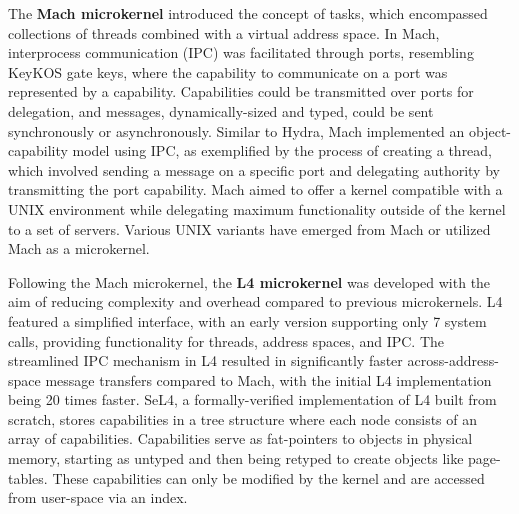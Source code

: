 The \textbf{Mach microkernel} introduced the concept of tasks, which encompassed collections of threads 
combined with a virtual address space. In Mach, interprocess communication (IPC) was facilitated through 
ports, resembling KeyKOS gate keys, where the capability to communicate on a port was represented by a 
capability. Capabilities could be transmitted over ports for delegation, and messages, dynamically-sized 
and typed, could be sent synchronously or asynchronously. Similar to Hydra, Mach implemented an object-capability 
model using IPC, as exemplified by the process of creating a thread, which involved sending a message on a specific 
port and delegating authority by transmitting the port capability. Mach aimed to offer a kernel compatible with a 
UNIX environment while delegating maximum functionality outside of the kernel to a set of servers. Various 
UNIX variants have emerged from Mach or utilized Mach as a microkernel.
\newline

Following the Mach microkernel, the \textbf{L4 microkernel} was developed with the aim of reducing complexity and 
overhead compared to previous microkernels. L4 featured a simplified interface, with an early version 
supporting only 7 system calls, providing functionality for threads, address spaces, and IPC. 
The streamlined IPC mechanism in L4 resulted in significantly faster across-address-space message transfers 
compared to Mach, with the initial L4 implementation being 20 times faster. SeL4, a formally-verified 
implementation of L4 built from scratch, stores capabilities in a tree structure where each node consists 
of an array of capabilities. Capabilities serve as fat-pointers to objects in physical memory, starting 
as untyped and then being retyped to create objects like page-tables. These capabilities can only be modified 
by the kernel and are accessed from user-space via an index.
\newline

